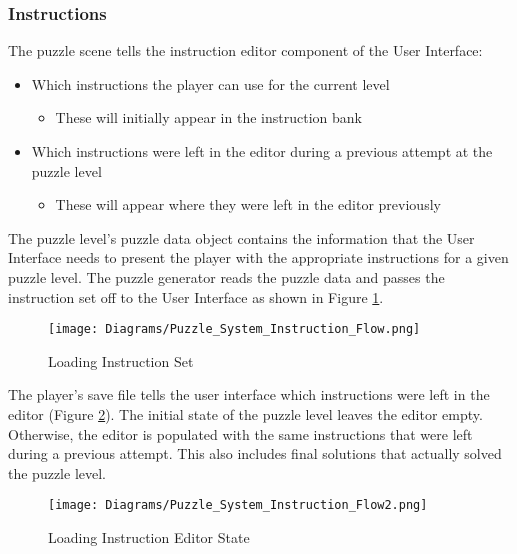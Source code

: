 \subsubsection{Instructions}
The puzzle scene tells the instruction editor component of the User Interface:
\begin{itemize}
  \item Which instructions the player can use for the current level
  \begin{itemize}
    \item These will initially appear in the instruction bank
  \end{itemize}
  \item Which instructions were left in the editor during a previous attempt at
  the puzzle level
  \begin{itemize}
    \item These will appear where they were left in the editor previously
  \end{itemize}
\end{itemize}

The puzzle level's puzzle data object contains the information that the User Interface
needs to present the player with the appropriate instructions for a given puzzle level.
The puzzle generator reads the puzzle data and passes the instruction set off to the User Interface
as shown in Figure \ref{fig:Instruction_Flow}.

\begin{figure}[t]
  \caption{Loading Instruction Set}
  \label{fig:Instruction_Flow}
  \centering
  \texttt{[image: Diagrams/Puzzle\_System\_Instruction\_Flow.png]}
\end{figure}

The player's save file tells the user interface which
instructions were left in the editor (Figure \ref{fig:Instruction_Flow2}). The initial state of the puzzle level leaves the
editor empty. Otherwise, the editor is populated with the same instructions that were
left during a previous attempt. This also includes final solutions that actually solved the
puzzle level.

\begin{figure}[!hb]
  \caption{Loading Instruction Editor State}
  \label{fig:Instruction_Flow2}
  \centering
  \texttt{[image: Diagrams/Puzzle\_System\_Instruction\_Flow2.png]}
\end{figure}
